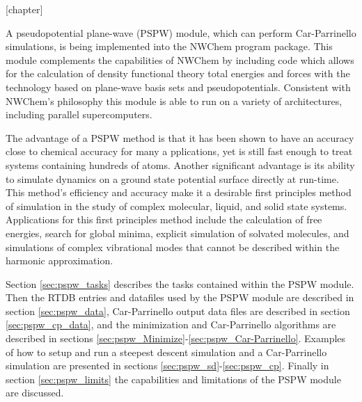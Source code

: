 \label{sec:pspw}

[chapter]
\def\thealgcounter{\thechapter.\arabic{algcounter}}
\newenvironment{algorithm}[1]
               { \refstepcounter{algcounter}
                \begin{center}
                  {\bf Algorithm} \thealgcounter: #1
                \end{center}
               \begin{center}\begin{enumerate} \em}
               {\end{enumerate}\end{center}}


A pseudopotential plane-wave (PSPW) module, which can perform Car-Parrinello
simulations, is being implemented into the NWChem program package.  
This module complements the capabilities of NWChem by including code 
which allows for the calculation of density functional theory total energies 
and forces with the technology based on plane-wave basis sets and 
pseudopotentials.  Consistent with NWChem's philosophy this module is able 
to run on a variety of architectures, including parallel supercomputers.

The advantage of a PSPW method is that it has been shown to have an accuracy 
close to chemical accuracy for many a  pplications, yet is still fast enough 
to treat systems containing hundreds of atoms.  Another significant advantage 
is its ability to simulate dynamics on a ground state potential surface 
directly at run-time.  This method's efficiency and accuracy make it a 
desirable first principles method of simulation in the study of complex 
molecular, liquid, and solid state systems.  Applications for this first 
principles method include the calculation of free energies, search for 
global minima, explicit simulation of solvated molecules, and simulations 
of complex vibrational modes that cannot be described within the harmonic 
approximation.

Section \ref{sec:pspw_tasks} describes the tasks contained within the PSPW module. 
Then the RTDB entries and datafiles used by the 
PSPW module are described in section \ref{sec:pspw_data},  Car-Parrinello output 
data files are described in section \ref{sec:pspw_cp_data}, and the minimization 
and Car-Parrinello algorithms are described in sections 
\ref{sec:pspw_Minimize}-\ref{sec:pspw_Car-Parrinello}. Examples of how to setup and run
a steepest descent simulation and a Car-Parrinello simulation are presented
in sections \ref{sec:pspw_sd}-\ref{sec:pspw_cp}.  Finally in section
\ref{sec:pspw_limits} the capabilities and limitations of the PSPW
module are discussed.

